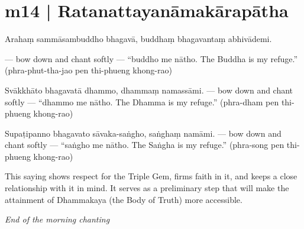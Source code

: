 \section*{m14 | Ratanattayanāmakārapātha}

\begin{chantsubsection}
  \chantnote
    {Arahaṃ sammāsambuddho bhagavā, buddhaṃ bhagavantaṃ abhivādemi.}
  \chantgap
  
  \chantnote
    {--- bow down and chant softly ---}
  \chantnote
    {“buddho me nātho.}
  \chantnote
    {The Buddha is my refuge.”}
  \chantindent
    {(phra-phut-tha-jao pen thi-phueng khong-rao)}
  \chantgap
  \chantgap

  \chantnote
    {Svākkhāto bhagavatā dhammo, dhammaṃ namassāmi.}
  \chantnote
    {--- bow down and chant softly ---}
  \chantnote
    {“dhammo me nātho.}
  \chantnote
    {The Dhamma is my refuge.”}
  \chantindent
    {(phra-dham pen thi-phueng khong-rao)}
  \chantgap
  \chantgap
  
  \chantnote
    {Supaṭipanno bhagavato sāvaka-saṅgho, saṅghaṃ namāmi.}
  \chantnote
    {--- bow down and chant softly ---}
  \chantnote
    {“saṅgho me nātho.}
  \chantnote
    {The Saṅgha is my refuge.”}
  \chantindent
    {(phra-song pen thi-phueng khong-rao)}
\end{chantsubsection}

\chantgap
\chantgap
{\englishstyle
This saying shows respect for the Triple Gem, firms faith in it, and keeps a close relationship with it in mind. It serves as a preliminary step that will make the attainment of Dhammakaya (the Body of Truth) more accessible.}

\chantgap
\chantgap
{\englishstyle\textit{End of the morning chanting}
}
